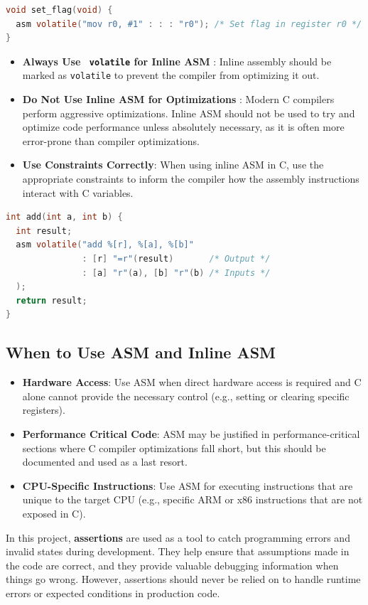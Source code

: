 \begin{lstlisting}[language = C]
void set_flag(void) {
  asm volatile("mov r0, #1" : : : "r0"); /* Set flag in register r0 */
}
\end{lstlisting}

\begin{itemize}
\item \textbf{Always Use \texttt { volatile} for
    Inline ASM
}: Inline assembly should be marked as \texttt{volatile} to prevent the compiler from optimizing it out.
    \item \textbf{Do Not Use Inline ASM for Optimizations
}: Modern C compilers perform aggressive optimizations. Inline ASM should not be used to try and optimize code performance unless absolutely necessary, as it is often more error-prone than compiler optimizations.
    \item \textbf{Use Constraints Correctly}: When using inline ASM in C, use the appropriate constraints to inform the compiler how the assembly instructions interact with C variables.
\end{itemize}

\begin{lstlisting}[language = C]
int add(int a, int b) {
  int result;
  asm volatile("add %[r], %[a], %[b]"
               : [r] "=r"(result)       /* Output */
               : [a] "r"(a), [b] "r"(b) /* Inputs */
  );
  return result;
}
\end{lstlisting}

\subsection{When to Use ASM and Inline ASM}
\begin{itemize}
    \item \textbf{Hardware Access}: Use ASM when direct hardware access is required and C alone cannot provide the necessary control (e.g., setting or clearing specific registers).
    \item \textbf{Performance Critical Code}: ASM may be justified in performance-critical sections where C compiler optimizations fall short, but this should be documented and used as a last resort.
    \item \textbf{CPU-Specific Instructions}: Use ASM for executing instructions that are unique to the target CPU (e.g., specific ARM or x86 instructions that are not exposed in C).
\end{itemize}

In this project, \textbf{assertions} are used as a tool to catch programming errors and invalid states during development. They help ensure that assumptions made in the code are correct, and they provide valuable debugging information when things go wrong. However, assertions should never be relied on to handle runtime errors or expected conditions in production code.

